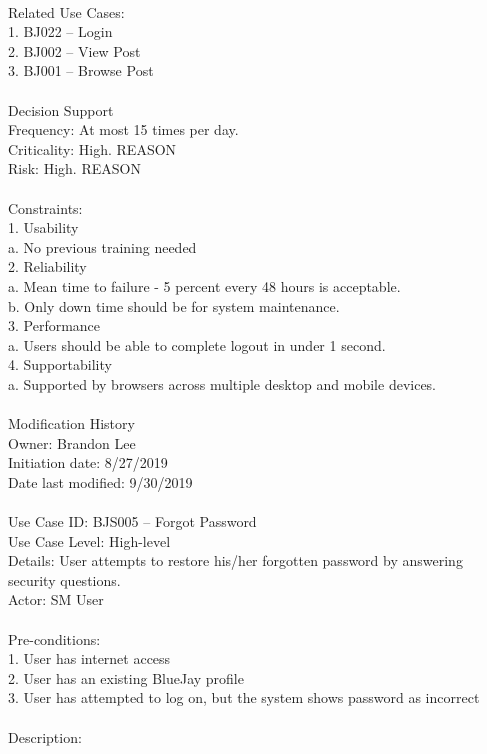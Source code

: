 \documentclass{report}
\begin{document}
\\
Related Use Cases: \\
1.	BJ022 – Login\\
2.	BJ002 – View Post\\
3.	BJ001 – Browse Post\\
\\
Decision Support\\
     Frequency: At most 15 times per day.\\
     Criticality: High. REASON\\
     Risk: High. REASON\\
\\
Constraints: \\
1.	Usability\\
a.	No previous training needed\\
2.  Reliability\\
a.	Mean time to failure - 5 percent every 48 hours is acceptable.\\
b.	Only down time should be for system maintenance.\\
3.	Performance\\
a.	Users should be able to complete logout in under 1 second.\\
4. 	Supportability\\
a. 	Supported by browsers across multiple desktop and mobile devices.\\
\\
Modification History\\
     Owner: Brandon Lee\\
     Initiation date: 8/27/2019\\
     Date last modified: 9/30/2019\\
\\
Use Case ID: BJS005 – Forgot Password\\
Use Case Level: High-level\\
Details: User attempts to restore his/her forgotten password by answering security questions.\\
Actor: SM User\\
\\
Pre-conditions: \\
1.	User has internet access\\
2.	User has an existing BlueJay profile\\
3.	User has attempted to log on, but the system shows password as incorrect\\
\\
Description: \\
\end{document}

